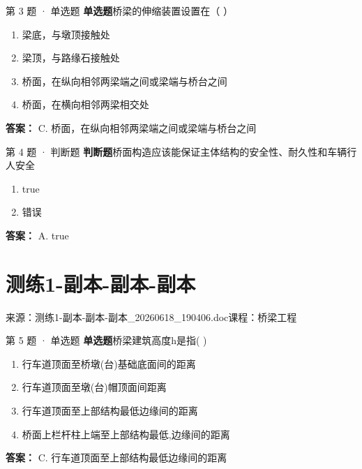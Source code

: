 \documentclass[UTF8,zihao=-4,openany]{ctexbook}
\newenvironment{choices}{\begin{enumerate}[label=\Alph*.,leftmargin=9mm,labelsep=3mm,itemsep=2pt,topsep=4pt]}{\end{enumerate}}
\newcommand{\qtype}[1]{\textcolor{brand}{\sffamily\bfseries #1}}
\newcommand{\sourcefile}[1]{\textcolor{muted}{\small\sffamily 来源：#1}}
\begin{document}
\begin{questionbox}{第 3 题 · 单选题}
\qtype{单选题}\quad 桥梁的伸缩装置设置在（ ）
\begin{choices}
\item 梁底，与墩顶接触处
\item 梁顶，与路缘石接触处
\item 桥面，在纵向相邻两梁端之间或梁端与桥台之间
\item 桥面，在横向相邻两梁相交处
\end{choices}
\begin{answerbox}
\textbf{答案：} C. 桥面，在纵向相邻两梁端之间或梁端与桥台之间
\end{answerbox}
\end{questionbox}

\begin{questionbox}{第 4 题 · 判断题}
\qtype{判断题}\quad 桥面构造应该能保证主体结构的安全性、耐久性和车辆行人安全
\begin{choices}
\item true
\item 错误
\end{choices}
\begin{answerbox}
\textbf{答案：} A. true
\end{answerbox}
\end{questionbox}

\chapter{测练1-副本-副本-副本}

\sourcefile{测练1-副本-副本-副本\_20260618\_190406.doc}\quad \textcolor{muted}{\small\sffamily 课程：桥梁工程}

\begin{questionbox}{第 5 题 · 单选题}
\qtype{单选题}\quad 桥梁建筑高度h是指( )
\begin{choices}
\item 行车道顶面至桥墩(台)基础底面间的距离
\item 行车道顶面至墩(台)帽顶面间距离
\item 行车道顶面至上部结构最低边缘间的距离
\item 桥面上栏杆柱上端至上部结构最低,边缘间的距离
\end{choices}
\begin{answerbox}
\textbf{答案：} C. 行车道顶面至上部结构最低边缘间的距离
\end{answerbox}
\end{questionbox}
\end{document}

